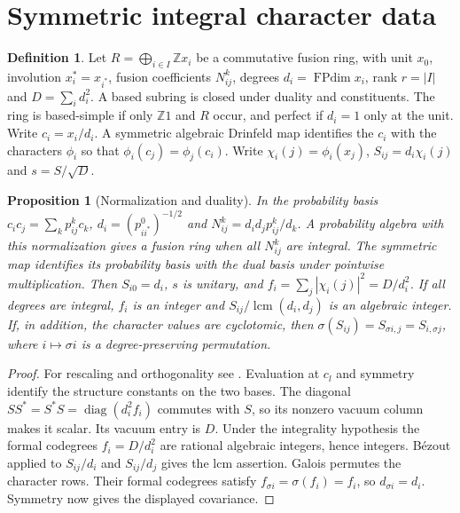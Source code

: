 \documentclass[11pt]{amsart}
\numberwithin{equation}{section}
\newtheorem{proposition}[theorem]{Proposition}
\theoremstyle{definition}
\newtheorem{definition}[theorem]{Definition}
\theoremstyle{plain}
\DeclareMathOperator{\lcm}{lcm}
\DeclareMathOperator{\FPdim}{FPdim}
\newcommand{\ZZ}{\mathbb Z}
\begin{document}
\section{Symmetric integral character data}\label{alg:framework}

\begin{definition}\label{alg:based}\label{alg:probability}\label{alg:drinfeld}
Let $R=\bigoplus_{i\in I}\ZZ x_i$ be a commutative fusion ring, with
unit $x_0$, involution $x_i^*=x_{i^*}$, fusion coefficients $N_{ij}^k$,
degrees $d_i=\FPdim x_i$, rank $r=|I|$ and $D=\sum_i d_i^2$.
A based subring is closed under duality and constituents. The ring is
based-simple if only $\ZZ 1$ and $R$ occur, and perfect if $d_i=1$ only
at the unit. Write $c_i=x_i/d_i$. A symmetric algebraic Drinfeld map
identifies the $c_i$ with the characters $\phi_i$ so that
$\phi_i(c_j)=\phi_j(c_i)$. Write $\chi_i(j)=\phi_i(x_j)$,
$S_{ij}=d_i\chi_i(j)$ and $s=S/\sqrt D$.
\end{definition}

\begin{proposition}[Normalization and duality]\label{alg:normalization}\label{alg:duality}
In the probability basis $c_i c_j=\sum_k p_{ij}^k c_k$,
$d_i=(p_{ii^*}^0)^{-1/2}$ and $N_{ij}^k=d_i d_j p_{ij}^k/d_k$.
A probability algebra with this normalization gives a fusion ring
when all $N_{ij}^k$ are integral. The symmetric map identifies its probability
basis with the dual basis under pointwise multiplication.
Then $S_{i0}=d_i$, $s$ is unitary, and
$f_i=\sum_j|\chi_i(j)|^2=D/d_i^2$. If all degrees are integral, $f_i$ is an integer and
$S_{ij}/\lcm(d_i,d_j)$ is an algebraic integer. If, in addition,
the character values are cyclotomic, then
$\sigma(S_{ij})=S_{\sigma i,j}=S_{i,\sigma j}$, where
$i\mapsto\sigma i$ is a degree-preserving permutation.
\end{proposition}
\begin{proof}
For rescaling and orthogonality see \cite[\S\S2.1--2.2]{BPBurnside}.
Evaluation at $c_l$ and symmetry identify the structure constants on the two bases.
The diagonal $SS^*=S^*S=\operatorname{diag}(d_i^2 f_i)$ commutes with $S$,
so its nonzero vacuum column makes it scalar. Its vacuum entry is $D$.
Under the integrality hypothesis the formal codegrees
$f_i=D/d_i^2$ are rational algebraic integers, hence integers.
B\'ezout applied to $S_{ij}/d_i$ and $S_{ij}/d_j$ gives the lcm
assertion. Galois permutes the character rows. Their formal
codegrees satisfy $f_{\sigma i}=\sigma(f_i)=f_i$, so
$d_{\sigma i}=d_i$. Symmetry now gives the displayed covariance.
\end{proof}
\end{document}
